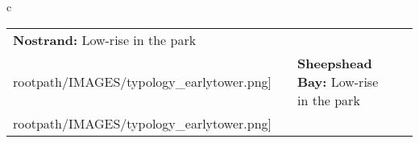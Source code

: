 \begin{table}[H]
        \begin{tabular}{c}
        \begin{tabular}{m{1.25in} m{2in} m{.1in} m{1.25in} m{2in}}
\textbf{Nostrand:} {Low-rise in the park} & \texttt{[image: \\rootpath/IMAGES/typology\_earlytower.png]} & & \textbf{Sheepshead Bay:} {Low-rise in the park} & \texttt{[image: \\rootpath/IMAGES/typology\_earlytower.png]}
\end{tabular}\end{tabular}
        \end{table}